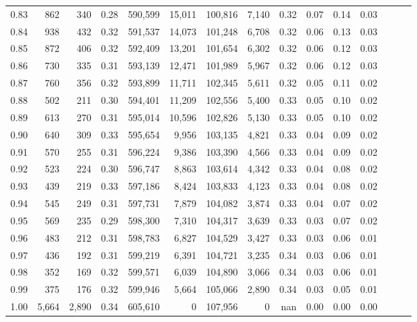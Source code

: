 \begin{tabular}{rrrrrrrrrrrrrrr}
0.83 &     862 &    340 &  0.28 &  590,599 &   15,011 &  100,816 &    7,140 &  0.32 &  0.07 &  0.14 &      0.03 \\
0.84 &     938 &    432 &  0.32 &  591,537 &   14,073 &  101,248 &    6,708 &  0.32 &  0.06 &  0.13 &      0.03 \\
0.85 &     872 &    406 &  0.32 &  592,409 &   13,201 &  101,654 &    6,302 &  0.32 &  0.06 &  0.12 &      0.03 \\
0.86 &     730 &    335 &  0.31 &  593,139 &   12,471 &  101,989 &    5,967 &  0.32 &  0.06 &  0.12 &      0.03 \\
0.87 &     760 &    356 &  0.32 &  593,899 &   11,711 &  102,345 &    5,611 &  0.32 &  0.05 &  0.11 &      0.02 \\
0.88 &     502 &    211 &  0.30 &  594,401 &   11,209 &  102,556 &    5,400 &  0.33 &  0.05 &  0.10 &      0.02 \\
0.89 &     613 &    270 &  0.31 &  595,014 &   10,596 &  102,826 &    5,130 &  0.33 &  0.05 &  0.10 &      0.02 \\
0.90 &     640 &    309 &  0.33 &  595,654 &    9,956 &  103,135 &    4,821 &  0.33 &  0.04 &  0.09 &      0.02 \\
0.91 &     570 &    255 &  0.31 &  596,224 &    9,386 &  103,390 &    4,566 &  0.33 &  0.04 &  0.09 &      0.02 \\
0.92 &     523 &    224 &  0.30 &  596,747 &    8,863 &  103,614 &    4,342 &  0.33 &  0.04 &  0.08 &      0.02 \\
0.93 &     439 &    219 &  0.33 &  597,186 &    8,424 &  103,833 &    4,123 &  0.33 &  0.04 &  0.08 &      0.02 \\
0.94 &     545 &    249 &  0.31 &  597,731 &    7,879 &  104,082 &    3,874 &  0.33 &  0.04 &  0.07 &      0.02 \\
0.95 &     569 &    235 &  0.29 &  598,300 &    7,310 &  104,317 &    3,639 &  0.33 &  0.03 &  0.07 &      0.02 \\
0.96 &     483 &    212 &  0.31 &  598,783 &    6,827 &  104,529 &    3,427 &  0.33 &  0.03 &  0.06 &      0.01 \\
0.97 &     436 &    192 &  0.31 &  599,219 &    6,391 &  104,721 &    3,235 &  0.34 &  0.03 &  0.06 &      0.01 \\
0.98 &     352 &    169 &  0.32 &  599,571 &    6,039 &  104,890 &    3,066 &  0.34 &  0.03 &  0.06 &      0.01 \\
0.99 &     375 &    176 &  0.32 &  599,946 &    5,664 &  105,066 &    2,890 &  0.34 &  0.03 &  0.05 &      0.01 \\
1.00 &   5,664 &  2,890 &  0.34 &  605,610 &        0 &  107,956 &        0 &   nan &  0.00 &  0.00 &      0.00 \\
\bottomrule
\end{tabular}
